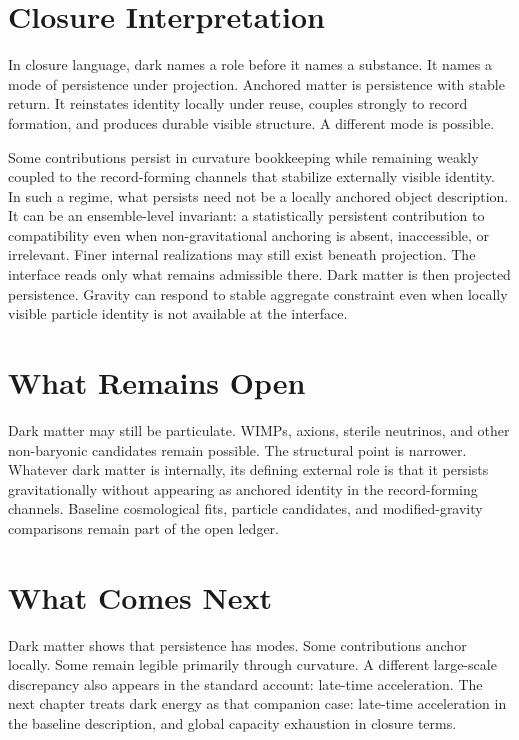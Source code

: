 \documentclass[11pt,twoside,openright]{book}
\begin{document}
\section*{Closure Interpretation}

In closure language, dark names a role before it names a substance. It names a mode of persistence under projection. Anchored matter is persistence with stable return. It reinstates identity locally under reuse, couples strongly to record formation, and produces durable visible structure. A different mode is possible.

Some contributions persist in curvature bookkeeping while remaining weakly coupled to the record-forming channels that stabilize externally visible identity. In such a regime, what persists need not be a locally anchored object description. It can be an ensemble-level invariant: a statistically persistent contribution to compatibility even when non-gravitational anchoring is absent, inaccessible, or irrelevant. Finer internal realizations may still exist beneath projection. The interface reads only what remains admissible there. Dark matter is then projected persistence. Gravity can respond to stable aggregate constraint even when locally visible particle identity is not available at the interface.

\section*{What Remains Open}

Dark matter may still be particulate. WIMPs, axions, sterile neutrinos, and other non-baryonic candidates remain possible. The structural point is narrower. Whatever dark matter is internally, its defining external role is that it persists gravitationally without appearing as anchored identity in the record-forming channels. Baseline cosmological fits, particle candidates, and modified-gravity comparisons remain part of the open ledger.

\section*{What Comes Next}

Dark matter shows that persistence has modes. Some contributions anchor locally. Some remain legible primarily through curvature. A different large-scale discrepancy also appears in the standard account: late-time acceleration. The next chapter treats dark energy as that companion case: late-time acceleration in the baseline description, and global capacity exhaustion in closure terms.
\end{document}
